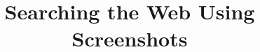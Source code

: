 \documentclass{www2010-submission}
\begin{document}
%
\title{Searching the Web Using Screenshots}
%
%

%

\end{document}
